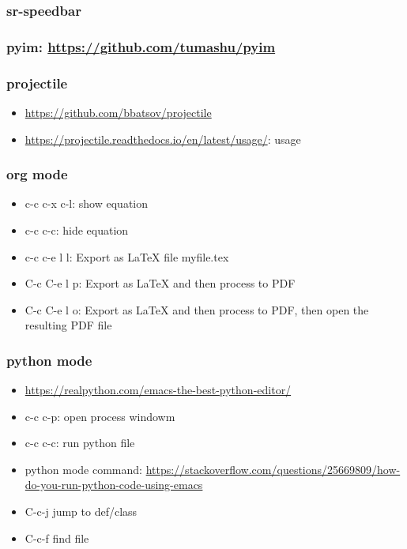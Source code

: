\documentclass[11pt]{article}
\begin{document}
\subsubsection{sr-speedbar}
\label{sec:org2658046}
\subsubsection{pyim: \url{https://github.com/tumashu/pyim}}
\label{sec:org3f7a57f}
\subsubsection{projectile}
\label{sec:org0278126}
\begin{itemize}
\item \url{https://github.com/bbatsov/projectile}
\item \url{https://projectile.readthedocs.io/en/latest/usage/}: usage
\end{itemize}
\subsubsection{org mode}
\label{sec:org45d6736}
\begin{itemize}
\item c-c c-x c-l: show equation
\item c-c c-c: hide equation
\item c-c c-e l l: Export as \LaTeX{} file myfile.tex
\item C-c C-e l p: Export as \LaTeX{} and then process to PDF
\item C-c C-e l o: Export as \LaTeX{} and then process to PDF, then open the resulting PDF file
\end{itemize}
\subsubsection{python mode}
\label{sec:org771dcc3}
\begin{itemize}
\item \url{https://realpython.com/emacs-the-best-python-editor/}
\item c-c c-p: open process windowm
\item c-c c-c: run python file
\item python mode command: \url{https://stackoverflow.com/questions/25669809/how-do-you-run-python-code-using-emacs}
\item C-c-j jump to def/class
\item C-c-f find file
\end{itemize}
\end{document}
